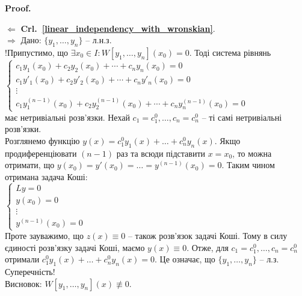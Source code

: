 \documentclass[a4paper, 10pt]{article}
\makeatletter
\def\qed{$\blacksquare$}
\def\rightproof{$\boxed{\Rightarrow}$ }
\def\leftproof{$\boxed{\Leftarrow}$ }
\theoremstyle{theoremdd}
\theoremstyle{theoremdd}
\theoremstyle{theoremdd}
\theoremstyle{theoremdd}
\theoremstyle{theoremdd}
\theoremstyle{theoremdd}
\theoremstyle{theoremdd}
\theoremstyle{theoremdd}
\renewenvironment{proof}[1][Proof.\\]{\par
\pushQED{\hfill \qed}%
\normalfont \topsep6\p@\@plus6\p@\relax
\trivlist
\item\relax
{\bfseries
#1\@addpunct{.}}\hspace\labelsep\ignorespaces
}{%
\popQED\endtrivlist\@endpefalse
}
\newcommand\crlref[1]{\textbf{Crl.~\ref{#1}}}
\makeatother
\begin{document}
\begin{proof}
\leftproof \crlref{linear_independency_with_wronskian}.
\bigskip \\
\rightproof Дано: $\{y_1, \dots, y_n\}$ -- л.н.з.\\
!Припустимо, що $\exists x_0 \in I: W[y_1, \dots, y_n](x_0) = 0$. Тоді система рівнянь \\
$\begin{cases}
c_1y_1(x_0) + c_2y_2(x_0) + \cdots + c_n y_n(x_0) = 0 \\
c_1y'_1(x_0) + c_2y'_2(x_0) + \cdots + c_n y'_n(x_0) = 0 \\
\vdots \\
c_1y^{(n-1)}_1(x_0) + c_2y^{(n-1)}_2(x_0) + \cdots + c_n y^{(n-1)}_n(x_0) = 0
\end{cases}
$\\
має нетривіальні розв'язки. Нехай $c_1 = c_1^0, \dots, c_n = c_n^0$ -- ті самі нетривіальні розв'язки.\\
Розглянемо функцію $y(x) = c_1^0 y_1(x) + \dots + c_n^0 y_n(x)$. Якщо продиференціювати $(n-1)$ раз та всюди підставити $x=x_0$, то можна отримати, що $y(x_0) = y'(x_0) = \dots = y^{(n-1)}(x_0) = 0$. Таким чином отримана задача Коші:\\
$
\begin{cases}
 Ly = 0\\
 y(x_0) = 0 \\
 \vdots \\
 y^{(n-1)}(x_0) = 0
\end{cases}
$\\
Проте зауважимо, що $z(x) \equiv 0$ -- також розв'язок задачі Коші. Тому в силу єдиності розв'язку задачі Коші, маємо $y(x) \equiv 0$. Отже, для $c_1 = c_1^0, \dots, c_n = c_n^0$ отримали $c_1^0 y_1(x) + \dots + c_n^0 y_n(x) = 0$. Це означає, що $\{y_1,\dots,y_n\}$ -- л.з. Суперечність!\\
Висновок: $W[y_1, \dots, y_n](x) \not\equiv 0$.
\end{proof}
\end{document}

